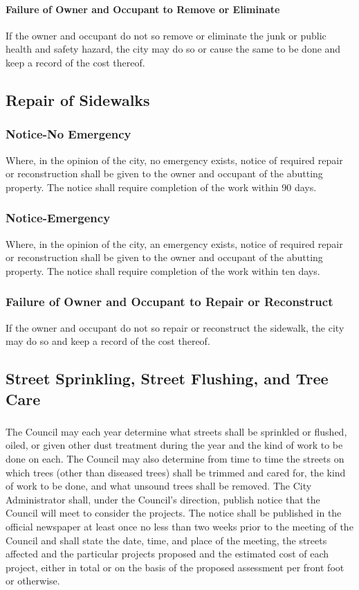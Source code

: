 \paragraph{Failure of Owner and Occupant to Remove or Eliminate}
If the owner and occupant do not so remove or eliminate the junk or public health and safety hazard, the city may do so or cause the same to be done and keep a record of the cost thereof.
\subsection{Repair of Sidewalks}
\subsubsection{Notice-No Emergency}
Where, in the opinion of the city, no emergency exists, notice of required repair or reconstruction shall be given to the owner and occupant of the abutting property.  The notice shall require completion of the work within 90 days.
\subsubsection{Notice-Emergency}
Where, in the opinion of the city, an emergency exists, notice of required repair or reconstruction shall be given to the owner and occupant of the abutting property.  The notice shall require completion of the work within ten days.
\subsubsection{Failure of Owner and Occupant to Repair or Reconstruct}
If the owner and occupant do not so repair or reconstruct the sidewalk, the city may do so and keep a record of the cost thereof.
\subsection{Street Sprinkling, Street Flushing, and Tree Care}
\subsubsection{}
The Council may each year determine what streets shall be sprinkled or flushed, oiled, or given other dust treatment during the year and the kind of work to be done on each.  The Council may also determine from time to time the streets on which trees (other than diseased trees) shall be trimmed and cared for, the kind of work to be done, and what unsound trees shall be removed.  The City Administrator shall, under the Council’s direction, publish notice that the Council will meet to consider the projects.  The notice shall be published in the official newspaper at least once no less than two weeks prior to the meeting of the Council and shall state the date, time, and place of the meeting, the streets affected and the particular projects proposed and the estimated cost of each project, either in total or on the basis of the proposed assessment per front foot or otherwise.
